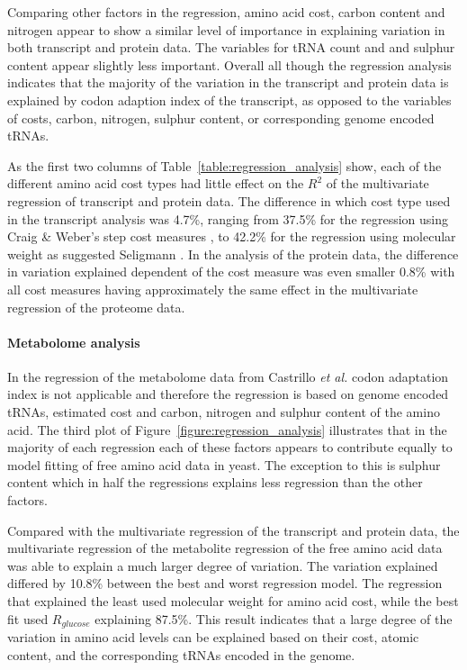 Comparing other factors in the regression, amino acid cost, carbon content and nitrogen appear to show a similar level of importance in explaining variation in both transcript and protein data. The variables for tRNA count and and sulphur content appear slightly less important. Overall all though the regression analysis indicates that the majority of the variation in the transcript and protein data is explained by codon adaption index of the transcript, as opposed to the variables of costs, carbon, nitrogen, sulphur content, or corresponding genome encoded tRNAs.

As the first two columns of Table~\vref{table:regression_analysis} show, each of the different amino acid cost types had little effect on the $R^2$ of the multivariate regression of transcript and protein data. The difference in which cost type used in the transcript analysis was 4.7\%, ranging from 37.5\% for the regression using Craig \& Weber's step cost measures \cite{craig1998}, to 42.2\% for the regression using molecular weight as suggested Seligmann \cite{seligmann2004}. In the analysis of the protein data, the difference in variation explained dependent of the cost measure was even smaller 0.8\% with all cost measures having approximately the same effect in the multivariate regression of the proteome data.

\paragraph{Metabolome analysis}

In the regression of the metabolome data from Castrillo \emph{et al.} \cite{castrillo2007} codon adaptation index is not applicable and therefore the regression is based on genome encoded tRNAs, estimated cost and carbon, nitrogen and sulphur content of the amino acid. The third plot of Figure~\ref{figure:regression_analysis} illustrates that in the majority of each regression each of these factors appears to contribute equally to model fitting of free amino acid data in yeast. The exception to this is sulphur content which in half the regressions explains less regression than the other factors.

Compared with the multivariate regression of the transcript and protein data, the multivariate regression of the metabolite regression of the free amino acid data was able to explain a much larger degree of variation. The variation explained differed by 10.8\% between the best and worst regression model. The regression that explained the least used molecular weight for amino acid cost, while the best fit used $R_{glucose}$ explaining 87.5\%. This result indicates that a large degree of the variation in amino acid levels can be explained based on their cost, atomic content, and the corresponding tRNAs encoded in the genome.

